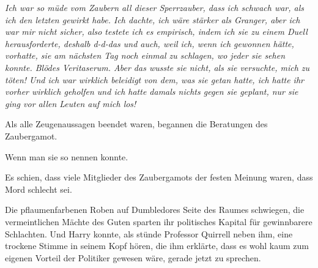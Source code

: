 \emph{Ich war so müde vom Zaubern all dieser Sperrzauber, dass ich schwach war, als ich den letzten gewirkt habe. Ich dachte, ich wäre stärker als Granger, aber ich war mir nicht sicher, also testete ich es empirisch, indem ich sie zu einem Duell herausforderte, deshalb d-d-das und auch, weil ich, wenn ich gewonnen hätte, vorhatte, sie am nächsten Tag noch einmal zu schlagen, wo jeder sie sehen konnte. Blödes Veritaserum. Aber das wusste \emph{sie} nicht, als sie versuchte, mich zu \emph{töten}! Und ich war wirklich beleidigt von dem, was sie getan hatte, ich hatte ihr vorher wirklich geholfen und ich hatte damals nichts gegen sie geplant, nur \emph{sie} ging vor allen Leuten auf \emph{mich} los!}

Als alle Zeugenaussagen beendet waren, begannen die Beratungen des Zaubergamot.

Wenn man sie so nennen konnte.

Es schien, dass viele Mitglieder des Zaubergamots der festen Meinung waren, dass Mord schlecht sei.

Die pflaumenfarbenen Roben auf Dumbledores Seite des Raumes schwiegen, die vermeintlichen Mächte des Guten sparten ihr politisches Kapital für gewinnbarere Schlachten.
Und Harry konnte, als stünde Professor Quirrell neben ihm, eine trockene Stimme in seinem Kopf hören, die ihm erklärte, dass es wohl kaum zum eigenen Vorteil der Politiker gewesen wäre, gerade jetzt zu sprechen.

